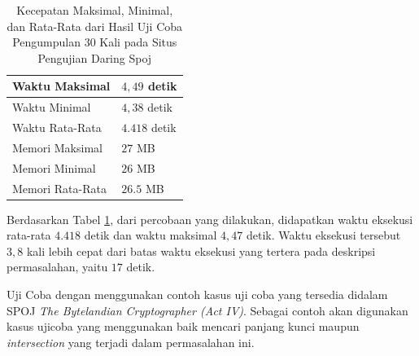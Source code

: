 \begin{table}[H]
	\centering
	\caption{Kecepatan Maksimal, Minimal, dan Rata-Rata dari Hasil Uji Coba Pengumpulan 30 Kali pada Situs Pengujian Daring Spoj}
	\begin{tabular}{|l|l|} \hline
		Waktu Maksimal & $ 4,49 $ detik\\ \hline
		Waktu Minimal & $ 4,38 $ detik\\ \hline
		Waktu Rata-Rata & $ 4.418 $ detik\\ \hline
		Memori Maksimal & $ 27 $ MB\\ \hline
		Memori Minimal & $ 26 $ MB\\ \hline
		Memori Rata-Rata & $ 26.5 $ MB\\ \hline
	\end{tabular}
	\label{tab:statistik}
\end{table}

\indent Berdasarkan Tabel \ref{tab:statistik}, dari percobaan yang dilakukan, didapatkan waktu eksekusi rata-rata $ 4.418 $ detik dan waktu maksimal $ 4,47 $ detik. Waktu eksekusi tersebut $3,8$ kali lebih cepat dari batas waktu eksekusi yang tertera pada deskripsi permasalahan, yaitu $ 17 $ detik.


\indent Uji Coba dengan menggunakan contoh kasus uji coba yang tersedia didalam SPOJ \textit{The Bytelandian Cryptographer (Act IV)}. Sebagai contoh akan digunakan kasus ujicoba yang menggunakan baik mencari panjang kunci maupun \textit{intersection} yang terjadi dalam permasalahan ini.


